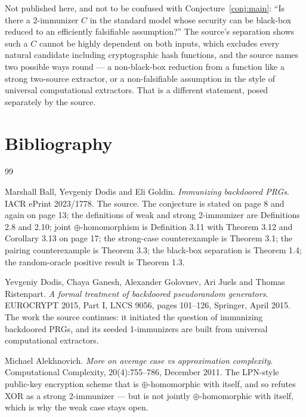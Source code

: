 \documentclass{aicr-conjecture}
\begin{document}
\begin{remark}\label{rem:other}
Not published here, and not to be confused with
Conjecture~\ref{conj:main}: ``Is there a 2-immunizer $C$ in the standard
model whose security can be black-box reduced to an efficiently
falsifiable assumption?'' The source's separation shows such a $C$ cannot
be highly dependent on both inputs, which excludes every natural
candidate including cryptographic hash functions, and the source names two
possible ways round --- a non-black-box reduction from a function like a
strong two-source extractor, or a non-falsifiable assumption in the
style of universal computational extractors. That is a different
statement, posed separately by the source.
\end{remark}

\section{Bibliography}

\begin{aicrbibliography}{99}

Marshall Ball, Yevgeniy Dodis and Eli Goldin.
\emph{Immunizing backdoored PRGs}.
IACR ePrint 2023/1778.
The source. The conjecture is stated on page 8 and again on page 13; the
definitions of weak and strong 2-immunizer are Definitions 2.8 and 2.10;
joint $\oplus$-homomorphism is Definition 3.11 with Theorem 3.12 and
Corollary 3.13 on page 17; the strong-case counterexample is Theorem 3.1;
the pairing counterexample is Theorem 3.3; the black-box separation is
Theorem 1.4; the random-oracle positive result is Theorem 1.3.

Yevgeniy Dodis, Chaya Ganesh, Alexander Golovnev, Ari Juels and
Thomas Ristenpart.
\emph{A formal treatment of backdoored pseudorandom generators}.
EUROCRYPT 2015, Part I, LNCS 9056, pages 101--126, Springer, April 2015.
The work the source continues: it initiated the question of immunizing
backdoored PRGs, and its seeded 1-immunizers are built from universal
computational extractors.

Michael Alekhnovich.
\emph{More on average case vs approximation complexity}.
Computational Complexity, 20(4):755--786, December 2011.
The LPN-style public-key encryption scheme that is $\oplus$-homomorphic
with itself, and so refutes XOR as a strong 2-immunizer --- but is not
jointly $\oplus$-homomorphic with itself, which is why the weak case
stays open.

\end{aicrbibliography}
\end{document}

